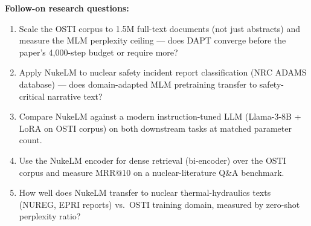 \documentclass[11pt]{article}
\begin{document}
\noindent\textbf{Follow-on research questions:}
\begin{enumerate}[leftmargin=1.6em,itemsep=0.2em,topsep=0.2em,label=Q\arabic*.]
\item Scale the OSTI corpus to 1.5M full-text documents (not just abstracts) and measure the MLM perplexity ceiling --- does DAPT converge before the paper's 4,000-step budget or require more?
\item Apply NukeLM to nuclear safety incident report classification (NRC ADAMS database) --- does domain-adapted MLM pretraining transfer to safety-critical narrative text?
\item Compare NukeLM against a modern instruction-tuned LLM (Llama-3-8B + LoRA on OSTI corpus) on both downstream tasks at matched parameter count.
\item Use the NukeLM encoder for dense retrieval (bi-encoder) over the OSTI corpus and measure MRR@10 on a nuclear-literature Q\&A benchmark.
\item How well does NukeLM transfer to nuclear thermal-hydraulics texts (NUREG, EPRI reports) vs.\ OSTI training domain, measured by zero-shot perplexity ratio?
\end{enumerate}
\end{document}
